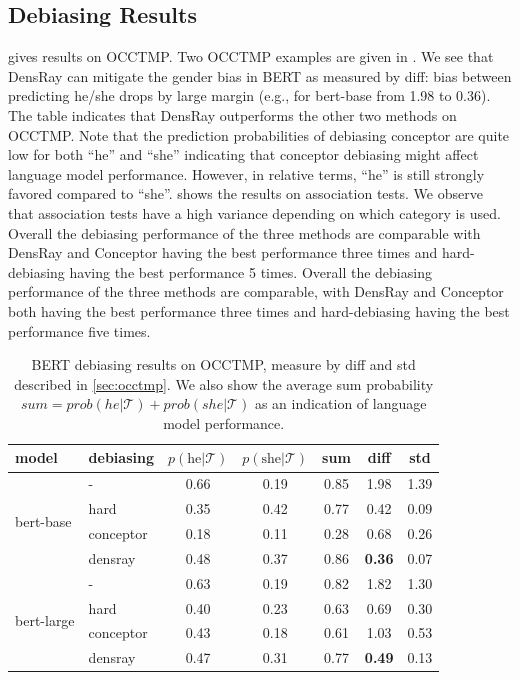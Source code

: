 
\subsection{Debiasing Results}
 gives results on OCCTMP. Two OCCTMP
examples are given in . We see that
DensRay can mitigate the gender bias in BERT as measured by
diff: bias between predicting he/she drops by large margin
(e.g., for bert-base from 1.98 to 0.36). The table indicates
that DensRay outperforms the other two methods on OCCTMP.
Note that
the prediction probabilities of debiasing conceptor are
quite low for both ``he'' and ``she'' indicating that conceptor debiasing might affect language model performance. However,
in relative terms, ``he'' is still strongly favored compared
to ``she''.
 shows the results on association tests. We observe that association tests have a high variance depending on which category is used. 
Overall the debiasing performance of the three methods are comparable with DensRay and Conceptor having the best performance three times and hard-debiasing having the best performance 5 times.
Overall the debiasing performance of the three methods are comparable, with DensRay and Conceptor both having the best performance three times and hard-debiasing having the best performance five times.

\begin{table}[ht]
\centering
\footnotesize
\vspace{0cm}  
\setlength{\abovecaptionskip}{0.2cm}   
\setlength{\belowcaptionskip}{0cm}
\begin{tabular}{llccccc}
	\hline
	model & debiasing &$p(\text{he} | {\mathcal T})$ & $p(\text{she} | {\mathcal T})$& sum & diff & std\\
	\hline
	\multirow{4}{2cm}{bert-base} & - & 0.66 & 0.19 & 0.85 &1.98&1.39\\
	&hard & 0.35 & 0.42 & 0.77&0.42&0.09\\
	&conceptor & 0.18 & 0.11 & 0.28 & 0.68&0.26\\
	&densray & 0.48 & 0.37 & 0.86&\textbf{0.36}&0.07\\
	\hline
	\multirow{4}{2cm}{bert-large} & -  & 0.63 & 0.19 & 0.82  &1.82&1.30\\
	&hard & 0.40 & 0.23 & 0.63&0.69&0.30\\
	&conceptor & 0.43 & 0.18 & 0.61 & 1.03&0.53\\
	&densray  & 0.47 & 0.31 & 0.77&\textbf{0.49}&0.13 \\
	\hline
\end{tabular}
\caption{ BERT debiasing results on OCCTMP, measure by diff and std described in \ref{sec:occtmp}. We also show the average sum probability $sum=prob(he|{\mathcal T})+prob(she|{\mathcal T})$ as an indication of language model performance.}
\end{table}

